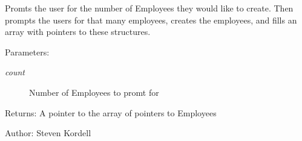 Promts the user for the number of Employees they would like to create. Then prompts the users for that many employees, creates the employees, and fills an array with pointers to these structures. \begin{Desc}
\item[Parameters:]
\begin{description}
\item[{\em count}]Number of Employees to promt for \end{description}
\end{Desc}
\begin{Desc}
\item[Returns:]A pointer to the array of pointers to Employees \end{Desc}
\begin{Desc}
\item[Author:]Steven Kordell \end{Desc}
